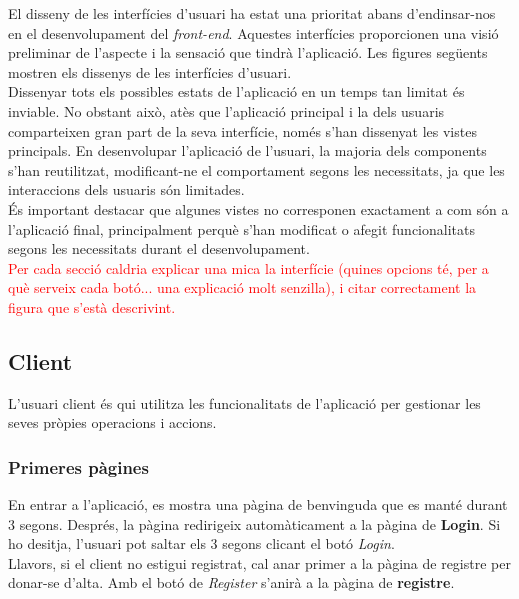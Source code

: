 \documentclass[a4paper,12pt,twoside]{ThesisStyle}
\newcommand{\pau}[1]{\textcolor{red}{#1}}
\begin{document}
El disseny de les interfícies d'usuari ha estat una prioritat abans d'endinsar-nos en el desenvolupament del \textit{front-end}. Aquestes interfícies proporcionen una visió preliminar de l'aspecte i la sensació que tindrà l'aplicació. Les figures següents mostren els dissenys de les interfícies d'usuari. \\

Dissenyar tots els possibles estats de l'aplicació en un temps tan limitat és inviable. No obstant això, atès que l'aplicació principal i la dels usuaris comparteixen gran part de la seva interfície, només s'han dissenyat les vistes principals. En desenvolupar l'aplicació de l'usuari, la majoria dels components s'han reutilitzat, modificant-ne el comportament segons les necessitats, ja que les interaccions dels usuaris són limitades.\\

És important destacar que algunes vistes no corresponen exactament a com són a l'aplicació final, principalment perquè s'han modificat o afegit funcionalitats segons les necessitats durant el desenvolupament.\\

\pau{Per cada secció caldria explicar una mica la interfície (quines opcions té, per a què serveix cada botó... una explicació molt senzilla), i citar correctament la figura que s'està descrivint.}


\subsection{Client}
\label{subsec: Client}

L'usuari client és qui utilitza les funcionalitats de l'aplicació per gestionar les seves pròpies operacions i accions.

\subsubsection{Primeres pàgines}
\label{subsubsec: Primeres pàgines}

En entrar a l'aplicació, es mostra una pàgina de benvinguda que es manté durant 3 segons. Després, la pàgina redirigeix automàticament a la pàgina de \textbf{Login}. Si ho desitja, l'usuari pot saltar els 3 segons clicant el botó \textit{Login}.\\

Llavors, si el client no estigui registrat, cal anar primer a la pàgina de registre per donar-se d'alta. Amb el botó de \textit{Register} s'anirà a la pàgina de \textbf{registre}.
\end{document}
